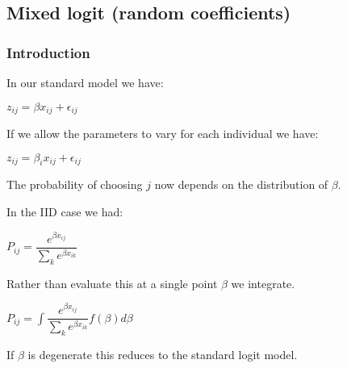 
\subsection{Mixed logit (random coefficients)}

\subsubsection{Introduction}

In our standard model we have:

\(z_{ij}=\beta x_{ij} +\epsilon_{ij} \)

If we allow the parameters to vary for each individual we have:

\(z_{ij}=\beta_i x_{ij} +\epsilon_{ij} \)

The probability of choosing \(j\) now depends on the distribution of \(\beta \).

In the IID case we had:

\(P_{ij}=\dfrac{e^{\beta x_{ij}}}{\sum_k e^{\beta x_{ik}}}\)

Rather than evaluate this at a single point \(\beta \) we integrate.

\(P_{ij}=\int \dfrac{e^{\beta x_{ij}}}{\sum_k e^{\beta x_{ik}}}f(\beta )d\beta \)

If \(\beta \) is degenerate this reduces to the standard logit model.

